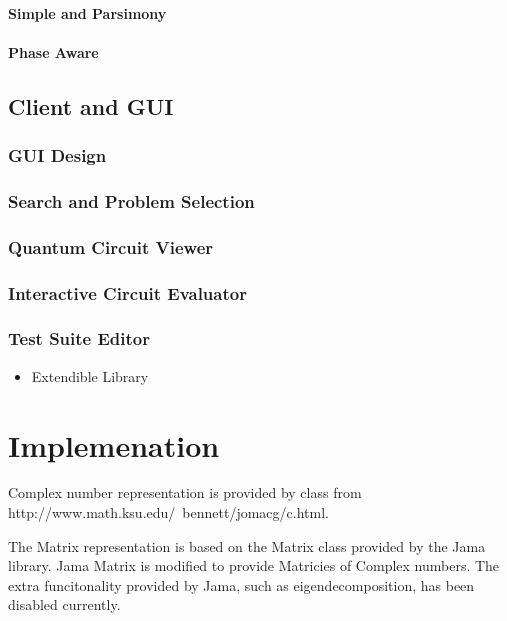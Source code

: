 \documentclass[authoryearcitations]{UoYCSproject}
\begin{document}
\subsubsection{Simple and Parsimony}

\subsubsection{Phase Aware}

\section{Client and GUI}

\subsection{GUI Design}

\subsection{Search and Problem Selection}

\subsection{Quantum Circuit Viewer}

\subsection{Interactive Circuit Evaluator}

\subsection{Test Suite Editor}



\begin{itemize}
 \item Extendible Library
\end{itemize}

\chapter{Implemenation}

Complex number representation is provided by class from http://www.math.ksu.edu/~bennett/jomacg/c.html.

The Matrix representation is based on the Matrix class provided by the Jama library.
Jama Matrix is modified to provide Matricies of Complex numbers.
The extra funcitonality provided by Jama, such as eigendecomposition, has been disabled currently.
\end{document}
